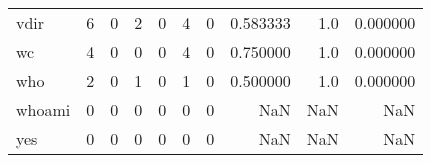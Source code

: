\begin{tabular}{lrrrrrrrrr}
vdir      &                                       6 &                                                  0 &                                                  2 &                                                  0 &                                                  4 &                                                  0 &                                           0.583333 &                                    1.0 &                             0.000000 \\
wc        &                                       4 &                                                  0 &                                                  0 &                                                  0 &                                                  4 &                                                  0 &                                           0.750000 &                                    1.0 &                             0.000000 \\
who       &                                       2 &                                                  0 &                                                  1 &                                                  0 &                                                  1 &                                                  0 &                                           0.500000 &                                    1.0 &                             0.000000 \\
whoami    &                                       0 &                                                  0 &                                                  0 &                                                  0 &                                                  0 &                                                  0 &                                                NaN &                                    NaN &                                  NaN \\
yes       &                                       0 &                                                  0 &                                                  0 &                                                  0 &                                                  0 &                                                  0 &                                                NaN &                                    NaN &                                  NaN \\
\bottomrule
\end{tabular}
